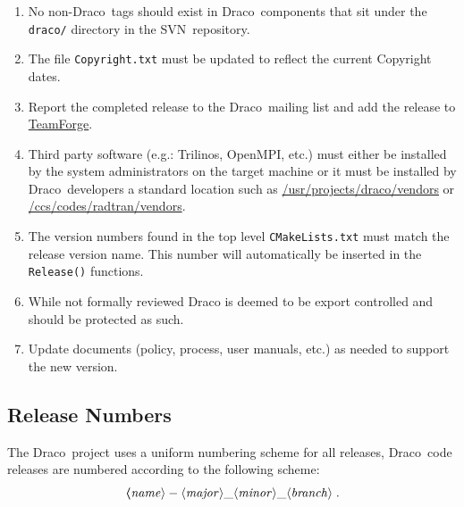 \documentclass[note]{newmemo}
\newcommand{\draco}{{\normalfont\small\sffamily Draco}}
\newcommand{\cvs}{\textsf{CVS}}
\newcommand{\svn}{\textsf{SVN}}
\begin{document}
\begin{enumerate}

\item No non-\draco\ tags should exist in \draco\ components that sit
  under the \texttt{draco/} directory in the \svn\ repository. 

\item The file \texttt{Copyright.txt} must be updated to reflect the
  current Copyright dates.

\item Report the completed release to the \draco\ mailing list and add
  the release to
  \href{https://tf.lanl.gov/sf/frs/do/viewSummary/projects.draco/frs}{TeamForge}. 

\item Third party software (e.g.: Trilinos, OpenMPI, etc.) must either
  be installed by the system administrators on the target machine or
  it must be installed by \draco\ developers a standard location such as
  \url{/usr/projects/draco/vendors} or
  \url{/ccs/codes/radtran/vendors}. 

\item The version numbers found in the top level
  \texttt{CMakeLists.txt} must match the release version name.  This
  number will automatically be inserted in the \texttt{Release()}
  functions.

\item While not formally reviewed Draco is deemed to be export
  controlled and should be protected as such.

\item Update documents (policy, process, user manuals, etc.) as needed
  to support the new version.
\end{enumerate}


\subsection{Release Numbers}
\label{sec:rel_num}

The \draco\ project uses a uniform numbering scheme for all releases,
\draco\ code releases are numbered according to the following scheme:
\begin{equation}
  \boldsymbol
  \langle\mathit{name}\rangle-
  \langle\mathit{major}\rangle\_
  \langle\mathit{minor}\rangle\_
  \langle\mathit{branch}\rangle\; .
  \notag
\end{equation}
\end{document}
